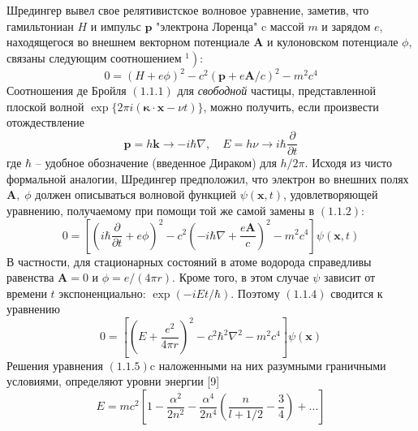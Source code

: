 \documentclass[a5paper,10pt]{article}
\theoremstyle{plain} %
\theoremstyle{definition} %
\theoremstyle{remark} %
\begin{document}
\newcommand{\anonsection}[1]{\section*{#1}\addcontentsline{toc}{part}{#1}}
\newcommand{\un}{\underline}
\newcommand{\ve}{\vec}



Шредингер вывел свое релятивистское волновое уравнение, заметив, что гамильтониан $H$ и импульс $\mathbf{p}$ "электрона Лоренца" $\mathrm{c}$ массой $m$ и зарядом $e$, находящегося во внешнем векторном потенциале $\mathbf{A}$ и кулоновском потенциале $\phi$, связаны следующим соотношением $\left.^{1}\right):$
$$
0=(H+e \phi)^{2}-c^{2}(\mathbf{p}+e \mathbf{A} / c)^{2}-m^{2} c^{4}
$$
Соотношения де Бройля $(1.1 .1)$ для \textit{свободной} частицы, представленной плоской волной $\exp \{2 \pi i(\boldsymbol{\kappa} \cdot \mathbf{x}-\nu t)\}$, можно получить, если произвести отождествление
$$
\mathbf{p}=h \mathbf{k} \rightarrow-i \hbar \nabla, \quad E=h \nu \rightarrow i \hbar \frac{\partial}{\partial t}
$$
где $\hbar$ -- удобное обозначение (введенное Дираком) для $h / 2 \pi .$ Исходя из чисто формальной аналогии, Шредингер предположил, что электрон во внешних полях $\mathbf{A}, \;\phi$ должен описываться волновой функцией $\psi(\mathbf{x}, t)$, удовлетворяющей уравнению, получаемому при помощи той же самой замены в $(1.1 .2):$
$$
0=\left[\left(i \hbar \frac{\partial}{\partial t}+e \phi\right)^{2}-c^{2}\left(-i \hbar \nabla+\frac{e \mathbf{A}}{c}\right)^{2}-m^{2} c^{4}\right] \psi(\mathbf{x}, t)
$$
В частности, для стационарных состояний в атоме водорода справедливы равенства $\mathbf{A}=0$ и $\phi=e /(4 \pi r) .$ Кроме того, в этом случае $\psi$ зависит от времени $t$ экспоненциально: $\exp (-i E t / \hbar) .$ Поэтому $(1.1 .4)$ сводится к уравнению
$$
0=\left[\left(E+\frac{e^{2}}{4 \pi r}\right)^{2}-c^{2} \hbar^{2} \nabla^{2}-m^{2} c^{4}\right] \psi(\mathbf{x})
$$
Решения уравнения $(1.1 .5) \mathrm{c}$ наложенными на них разумными граничными условиями, определяют уровни энергии [9]
$$
E=m c^{2}\left[1-\frac{\alpha^{2}}{2 n^{2}}-\frac{\alpha^{4}}{2 n^{4}}\left(\frac{n}{l+1 / 2}-\frac{3}{4}\right)+\ldots\right]
$$
\end{document}
